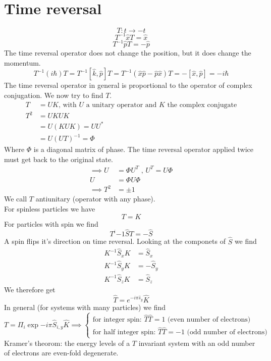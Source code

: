 \documentclass{report}
\begin{document}
\section{Time reversal}
\[
T: t \to -t
\] \[
T^{-1} \hat{x} T = \hat{x}
\] \[
T^{-1} \hat{p} T = -\hat{p}
\] The time reversal operator does not change the position, but it does change the momentum. \[
T^{-1} \left( i \hbar \right) T = T^{-1} [\hat{k}, \hat{p}] T = T^{-1} \left( \hat{x}\hat{p} - \hat{p} \hat{x} \right) T =  -[\hat{x}, \hat{p}] = -i \hbar
\] The time reversal operator in general is proportional to the operator of complex conjugation. We now try to find $T$.
\begin{align*}
	T &=  UK\text{, with $U$ a unitary operator and $K$ the complex conjugate} \\
	T^2 &= UKUK  \\
	    &= U\left( KUK \right) =  U U^* \\
	    &= U\left( UT \right)^{-1} = \Phi 
\end{align*} Where $\Phi $ is a diagonal matrix of phase. The time reversal operator applied twice must get back to the original state.
\begin{align*}
	\implies U &=  \Phi U^T \text{ , } U^T = U\Phi \\
	U &= \Phi U \Phi \\
	\implies T^2 &= \pm 1
\end{align*} We call $T$ antiunitary (operator with any phase).\\
For spinless particles we have \[
T = K
\] For particles with spin we find \[
T^i{-1} \hat{S} T = - \hat{S}
\] A spin flips it's direction on time reversal. Looking at the componets of $\hat{S}$ we find
\begin{align*}
	K^{-1} \hat{S}_x K &= \hat{S}_x \\
	K^{-1} \hat{S}_y K &=  - \hat{S}_y \\
	K^{-1} \hat{S}_z K &= \hat{S}_z
\end{align*} We therefore get \[
\hat{T} = e^{-i \pi \hat{s}_y} \hat{K}
\] In general (for systems with many particles) we find \[
T = \Pi_i \exp{ -i \pi \hat{S}_{i,y}} \hat{K} \implies \begin{cases}
	\text{for integer spin: } \hat{T} \hat{T} = 1 \text{ (even number of electrons)}\\
	\text{for half integer spin: } \hat{T} \hat{T} = -1 \text{ (odd number of electrons)}
\end{cases}
\] 
Kramer's theorom: the energy levels of a $T$ invariant system with an odd number of electrons are even-fold degenerate.\\
\end{document}
